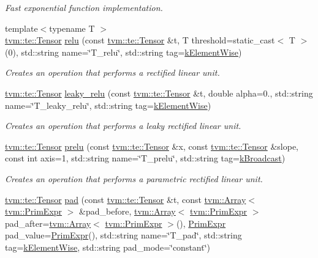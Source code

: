 \begin{DoxyCompactItemize}
\begin{DoxyCompactList}\small\item\em Fast exponential function implementation. \end{DoxyCompactList}\item 
{\footnotesize template$<$typename T $>$ }\\\hyperlink{classtvm_1_1te_1_1Tensor}{tvm\+::te\+::\+Tensor} \hyperlink{namespacetopi_a10d042035b5084fc91bff8ae4f1b0d86}{relu} (const \hyperlink{classtvm_1_1te_1_1Tensor}{tvm\+::te\+::\+Tensor} \&t, T threshold=static\+\_\+cast$<$ T $>$(0), std\+::string name=\char`\"{}T\+\_\+relu\char`\"{}, std\+::string tag=\hyperlink{namespacetopi_ac1b34ed59d38a5f5338bee6b2cad42be}{k\+Element\+Wise})
\begin{DoxyCompactList}\small\item\em Creates an operation that performs a rectified linear unit. \end{DoxyCompactList}\item 
\hyperlink{classtvm_1_1te_1_1Tensor}{tvm\+::te\+::\+Tensor} \hyperlink{namespacetopi_a21006707a9f93d8b2771b5a10668419f}{leaky\+\_\+relu} (const \hyperlink{classtvm_1_1te_1_1Tensor}{tvm\+::te\+::\+Tensor} \&t, double alpha=0., std\+::string name=\char`\"{}T\+\_\+leaky\+\_\+relu\char`\"{}, std\+::string tag=\hyperlink{namespacetopi_ac1b34ed59d38a5f5338bee6b2cad42be}{k\+Element\+Wise})
\begin{DoxyCompactList}\small\item\em Creates an operation that performs a leaky rectified linear unit. \end{DoxyCompactList}\item 
\hyperlink{classtvm_1_1te_1_1Tensor}{tvm\+::te\+::\+Tensor} \hyperlink{namespacetopi_ab86aad9c64d4739dc541d87ee3904f9b}{prelu} (const \hyperlink{classtvm_1_1te_1_1Tensor}{tvm\+::te\+::\+Tensor} \&x, const \hyperlink{classtvm_1_1te_1_1Tensor}{tvm\+::te\+::\+Tensor} \&slope, const int axis=1, std\+::string name=\char`\"{}T\+\_\+prelu\char`\"{}, std\+::string tag=\hyperlink{namespacetopi_a794b9155e9ba9d1c9c42a1cff1fb645f}{k\+Broadcast})
\begin{DoxyCompactList}\small\item\em Creates an operation that performs a parametric rectified linear unit. \end{DoxyCompactList}\item 
\hyperlink{classtvm_1_1te_1_1Tensor}{tvm\+::te\+::\+Tensor} \hyperlink{namespacetopi_a7d9e2d0f526ff451b6df91c6a673f440}{pad} (const \hyperlink{classtvm_1_1te_1_1Tensor}{tvm\+::te\+::\+Tensor} \&t, const \hyperlink{classtvm_1_1Array}{tvm\+::\+Array}$<$ \hyperlink{classtvm_1_1PrimExpr}{tvm\+::\+Prim\+Expr} $>$ \&pad\+\_\+before, \hyperlink{classtvm_1_1Array}{tvm\+::\+Array}$<$ \hyperlink{classtvm_1_1PrimExpr}{tvm\+::\+Prim\+Expr} $>$ pad\+\_\+after=\hyperlink{classtvm_1_1Array}{tvm\+::\+Array}$<$ \hyperlink{classtvm_1_1PrimExpr}{tvm\+::\+Prim\+Expr} $>$(), \hyperlink{classtvm_1_1PrimExpr}{Prim\+Expr} pad\+\_\+value=\hyperlink{classtvm_1_1PrimExpr}{Prim\+Expr}(), std\+::string name=\char`\"{}T\+\_\+pad\char`\"{}, std\+::string tag=\hyperlink{namespacetopi_ac1b34ed59d38a5f5338bee6b2cad42be}{k\+Element\+Wise}, std\+::string pad\+\_\+mode=\char`\"{}constant\char`\"{})

\end{DoxyCompactItemize}

